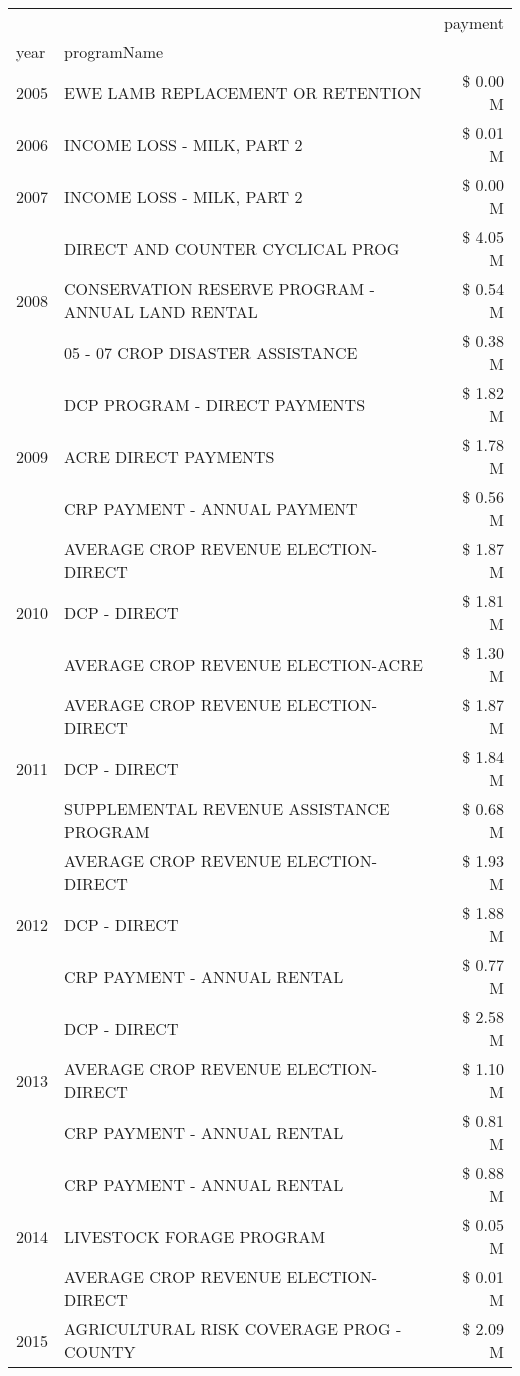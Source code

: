 \begin{tabular}{llr}
\toprule
 &  & payment \\
year & programName &  \\
\midrule
2005 & EWE LAMB REPLACEMENT OR RETENTION & \$ 0.00 M \\
\cline{1-3}
2006 & INCOME LOSS - MILK, PART 2 & \$ 0.01 M \\
\cline{1-3}
2007 & INCOME LOSS - MILK, PART 2 & \$ 0.00 M \\
\cline{1-3}
\multirow[t]{3}{*}{2008} & DIRECT AND COUNTER CYCLICAL PROG & \$ 4.05 M \\
 & CONSERVATION RESERVE PROGRAM - ANNUAL LAND RENTAL & \$ 0.54 M \\
 & 05 - 07 CROP DISASTER ASSISTANCE & \$ 0.38 M \\
\cline{1-3}
\multirow[t]{3}{*}{2009} & DCP PROGRAM - DIRECT PAYMENTS & \$ 1.82 M \\
 & ACRE DIRECT PAYMENTS & \$ 1.78 M \\
 & CRP PAYMENT - ANNUAL PAYMENT & \$ 0.56 M \\
\cline{1-3}
\multirow[t]{3}{*}{2010} & AVERAGE CROP REVENUE ELECTION-DIRECT & \$ 1.87 M \\
 & DCP - DIRECT & \$ 1.81 M \\
 & AVERAGE CROP REVENUE ELECTION-ACRE & \$ 1.30 M \\
\cline{1-3}
\multirow[t]{3}{*}{2011} & AVERAGE CROP REVENUE ELECTION-DIRECT & \$ 1.87 M \\
 & DCP - DIRECT & \$ 1.84 M \\
 & SUPPLEMENTAL REVENUE ASSISTANCE PROGRAM & \$ 0.68 M \\
\cline{1-3}
\multirow[t]{3}{*}{2012} & AVERAGE CROP REVENUE ELECTION-DIRECT & \$ 1.93 M \\
 & DCP - DIRECT & \$ 1.88 M \\
 & CRP PAYMENT - ANNUAL RENTAL & \$ 0.77 M \\
\cline{1-3}
\multirow[t]{3}{*}{2013} & DCP - DIRECT & \$ 2.58 M \\
 & AVERAGE CROP REVENUE ELECTION-DIRECT & \$ 1.10 M \\
 & CRP PAYMENT - ANNUAL RENTAL & \$ 0.81 M \\
\cline{1-3}
\multirow[t]{3}{*}{2014} & CRP PAYMENT - ANNUAL RENTAL & \$ 0.88 M \\
 & LIVESTOCK FORAGE PROGRAM & \$ 0.05 M \\
 & AVERAGE CROP REVENUE ELECTION-DIRECT & \$ 0.01 M \\
\cline{1-3}
\multirow[t]{3}{*}{2015} & AGRICULTURAL RISK COVERAGE PROG - COUNTY & \$ 2.09 M \\

\end{tabular}
